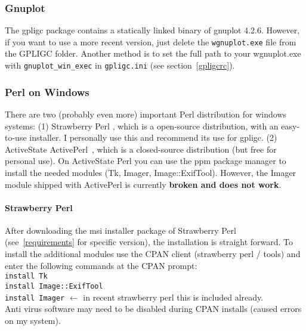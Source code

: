 \subsubsection{Gnuplot}
The gpligc package contains a statically linked binary of gnuplot 4.2.6. 
However, if you want to use a more recent version, just delete the \texttt{wgnuplot.exe} file from the GPLIGC folder.
Another method is to set the full path to your wgnuplot.exe with \texttt{gnuplot\_win\_exec} in \texttt{gpligc.ini} (see section~\ref{gpligcrc}).

\subsubsection{Perl on Windows}
\label{perl}
There are two (probably even more) important Perl distribution for windows systems:
(1) Strawberry Perl \cite{strawberryperl}, which is a open-source distribution, with an easy-to-use installer.
I personally use this and recommend its use for gpligc.
(2) ActiveState ActivePerl~\cite{activeperl}, which is a closed-source distribution (but free for personal use).
On ActiveState Perl you can use the ppm package manager to install the needed modules (Tk, Imager, Image::ExifTool).
However, the Imager module shipped with ActivePerl is currently \textbf{broken and does not work}.


\paragraph{Strawberry Perl}
After downloading the msi installer package of Strawberry Perl (see~\ref{requirements} for specific version),
the installation is straight forward.
To install the additional modules use the CPAN client (strawberry perl / tools) and enter the following commands
at the CPAN prompt:\\
\texttt{install Tk}\\
\texttt{install Image::ExifTool}\\
\texttt{install Imager}  $\leftarrow$ in recent strawberry perl this is included already.\\
Anti virus software may need to be disabled during CPAN installs (caused errors on my system).
